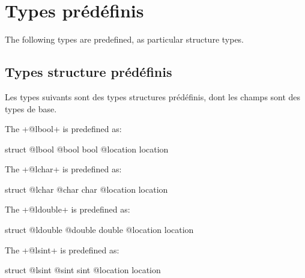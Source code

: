 
\chapter{Types prédéfinis}

The following types are predefined, as particular structure types.

\section{Types structure prédéfinis}

Les types suivants sont des types structures prédéfinis, dont les champs sont des types de base.
 

The \ggs+@lbool+ is predefined as:
\begin{galgas}
struct @lbool {
  @bool bool
  @location location
}
\end{galgas}





The \ggs+@lchar+ is predefined as:
\begin{galgas}
struct @lchar {
  @char char
  @location location
}
\end{galgas}








The \ggs+@ldouble+ is predefined as:
\begin{galgas}
struct @ldouble {
  @double double
  @location location
}
\end{galgas}








The \ggs+@lsint+ is predefined as:
\begin{galgas}
struct @lsint {
  @sint sint
  @location location
}
\end{galgas}








